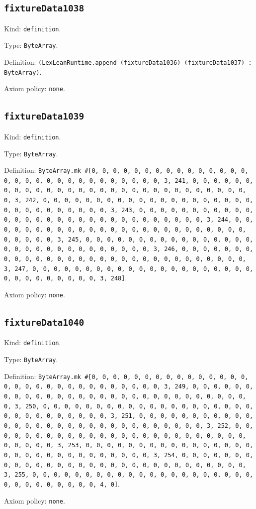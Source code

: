 \documentclass[11pt]{article}
\begin{document}
\subsection*{\texttt{fixtureData1038}}
\noindent Kind: \texttt{definition}.\par
\noindent Type: \texttt{ByteArray}.\par
\noindent Definition: \texttt{(LexLeanRuntime.append (fixtureData1036) (fixtureData1037) : ByteArray)}.\par
\noindent Axiom policy: \texttt{none}.\par
\subsection*{\texttt{fixtureData1039}}
\noindent Kind: \texttt{definition}.\par
\noindent Type: \texttt{ByteArray}.\par
\noindent Definition: \texttt{ByteArray.mk \#[0, 0, 0, 0, 0, 0, 0, 0, 0, 0, 0, 0, 0, 0, 0, 0, 0, 0, 0, 0, 0, 0, 0, 0, 0, 0, 0, 0, 0, 0, 3, 241, 0, 0, 0, 0, 0, 0, 0, 0, 0, 0, 0, 0, 0, 0, 0, 0, 0, 0, 0, 0, 0, 0, 0, 0, 0, 0, 0, 0, 0, 0, 3, 242, 0, 0, 0, 0, 0, 0, 0, 0, 0, 0, 0, 0, 0, 0, 0, 0, 0, 0, 0, 0, 0, 0, 0, 0, 0, 0, 0, 0, 0, 0, 3, 243, 0, 0, 0, 0, 0, 0, 0, 0, 0, 0, 0, 0, 0, 0, 0, 0, 0, 0, 0, 0, 0, 0, 0, 0, 0, 0, 0, 0, 0, 0, 3, 244, 0, 0, 0, 0, 0, 0, 0, 0, 0, 0, 0, 0, 0, 0, 0, 0, 0, 0, 0, 0, 0, 0, 0, 0, 0, 0, 0, 0, 0, 0, 3, 245, 0, 0, 0, 0, 0, 0, 0, 0, 0, 0, 0, 0, 0, 0, 0, 0, 0, 0, 0, 0, 0, 0, 0, 0, 0, 0, 0, 0, 0, 0, 3, 246, 0, 0, 0, 0, 0, 0, 0, 0, 0, 0, 0, 0, 0, 0, 0, 0, 0, 0, 0, 0, 0, 0, 0, 0, 0, 0, 0, 0, 0, 0, 3, 247, 0, 0, 0, 0, 0, 0, 0, 0, 0, 0, 0, 0, 0, 0, 0, 0, 0, 0, 0, 0, 0, 0, 0, 0, 0, 0, 0, 0, 0, 0, 3, 248]}.\par
\noindent Axiom policy: \texttt{none}.\par
\subsection*{\texttt{fixtureData1040}}
\noindent Kind: \texttt{definition}.\par
\noindent Type: \texttt{ByteArray}.\par
\noindent Definition: \texttt{ByteArray.mk \#[0, 0, 0, 0, 0, 0, 0, 0, 0, 0, 0, 0, 0, 0, 0, 0, 0, 0, 0, 0, 0, 0, 0, 0, 0, 0, 0, 0, 0, 0, 3, 249, 0, 0, 0, 0, 0, 0, 0, 0, 0, 0, 0, 0, 0, 0, 0, 0, 0, 0, 0, 0, 0, 0, 0, 0, 0, 0, 0, 0, 0, 0, 3, 250, 0, 0, 0, 0, 0, 0, 0, 0, 0, 0, 0, 0, 0, 0, 0, 0, 0, 0, 0, 0, 0, 0, 0, 0, 0, 0, 0, 0, 0, 0, 3, 251, 0, 0, 0, 0, 0, 0, 0, 0, 0, 0, 0, 0, 0, 0, 0, 0, 0, 0, 0, 0, 0, 0, 0, 0, 0, 0, 0, 0, 0, 0, 3, 252, 0, 0, 0, 0, 0, 0, 0, 0, 0, 0, 0, 0, 0, 0, 0, 0, 0, 0, 0, 0, 0, 0, 0, 0, 0, 0, 0, 0, 0, 0, 3, 253, 0, 0, 0, 0, 0, 0, 0, 0, 0, 0, 0, 0, 0, 0, 0, 0, 0, 0, 0, 0, 0, 0, 0, 0, 0, 0, 0, 0, 0, 0, 3, 254, 0, 0, 0, 0, 0, 0, 0, 0, 0, 0, 0, 0, 0, 0, 0, 0, 0, 0, 0, 0, 0, 0, 0, 0, 0, 0, 0, 0, 0, 0, 3, 255, 0, 0, 0, 0, 0, 0, 0, 0, 0, 0, 0, 0, 0, 0, 0, 0, 0, 0, 0, 0, 0, 0, 0, 0, 0, 0, 0, 0, 0, 0, 4, 0]}.\par
\noindent Axiom policy: \texttt{none}.\par
\end{document}
